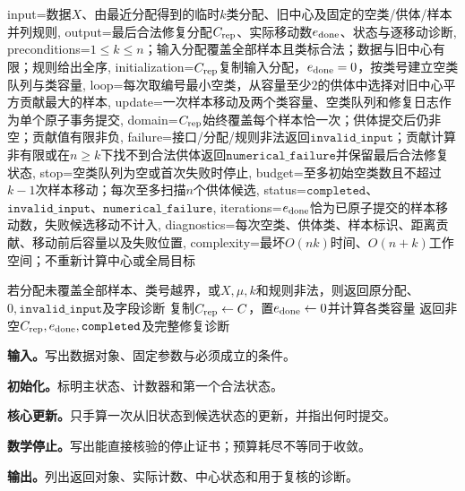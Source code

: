 \begin{AlgorithmContract}{
  input={数据$X$、由最近分配得到的临时$k$类分配、旧中心及固定的空类/供体/样本并列规则},
  output={最后合法修复分配$C_{\rm rep}$、实际移动数$e_{\rm done}$、状态与逐移动诊断},
  preconditions={$1\le k\le n$；输入分配覆盖全部样本且类标合法；数据与旧中心有限；规则给出全序},
  initialization={$C_{\rm rep}$复制输入分配，$e_{\rm done}=0$，按类号建立空类队列与类容量},
  loop={每次取编号最小空类，从容量至少$2$的供体中选择对旧中心平方贡献最大的样本},
  update={一次样本移动及两个类容量、空类队列和修复日志作为单个原子事务提交},
  domain={$C_{\rm rep}$始终覆盖每个样本恰一次；供体提交后仍非空；贡献值有限非负},
  failure={接口/分配/规则非法返回$\mathtt{invalid\_input}$；贡献计算非有限或在$n\ge k$下找不到合法供体返回$\mathtt{numerical\_failure}$并保留最后合法修复状态},
  stop={空类队列为空或首次失败时停止},
  budget={至多初始空类数且不超过$k-1$次样本移动；每次至多扫描$n$个供体候选},
  status={$\mathtt{completed}$、$\mathtt{invalid\_input}$、$\mathtt{numerical\_failure}$},
  iterations={$e_{\rm done}$恰为已原子提交的样本移动数，失败候选移动不计入},
  diagnostics={每次空类、供体类、样本标识、距离贡献、移动前后容量以及失败位置},
  complexity={最坏$O(nk)$时间、$O(n+k)$工作空间；不重新计算中心或全局目标}
}
\begin{algorithm}[H]
\caption{\kMeans{}的逐空类修复子程序}\label{alg:V4-C02-kmeans-empty-repair}
若分配未覆盖全部样本、类号越界，或$X,\mu,k$和规则非法，则返回原分配、$0,\mathtt{invalid\_input}$及字段诊断\;
复制$C_{\rm rep}\leftarrow C$，置$e_{\rm done}\leftarrow0$并计算各类容量\;
返回非空$C_{\rm rep},e_{\rm done},\mathtt{completed}$及完整修复诊断\;
\end{algorithm}
\end{AlgorithmContract}
\endgroup

\begingroup
\addtocounter{algocf}{-1}
\renewcommand{\thealgocf}{\thechapter.\arabic{algocf}C}

\begin{keypointbox}[title={多启动 的记录与选择：五步阅读}]
\textbf{输入。}写出数据对象、固定参数与必须成立的条件。\par
\textbf{初始化。}标明主状态、计数器和第一个合法状态。\par
\textbf{核心更新。}只手算一次从旧状态到候选状态的更新，并指出何时提交。\par
\textbf{数学停止。}写出能直接核验的停止证书；预算耗尽不等同于收敛。\par
\textbf{输出。}列出返回对象、实际计数、中心状态和用于复核的诊断。
\end{keypointbox}


